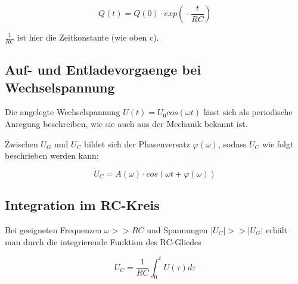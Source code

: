 \begin{equation}
    \label{}
    
Q(t) = Q(0)\cdot exp(-\frac{t}{RC})

\end{equation}

$\frac{1}{RC}$ ist hier die Zeitkonstante (wie oben c).


\subsection{Auf- und Entladevorgaenge bei Wechselspannung}
\label{subsec:Entladevorgaenge bei Wechselspannung}

Die angelegte Wechselspannung $U(t) = U_0 cos(\omega t)$ lässt sich als periodische Anregung beschreiben, 
wie sie auch aus der Mechanik bekannt ist.

Zwischen $U_G$ und $U_C$ bildet sich der Phasenversatz $\varphi(\omega)$, sodass $U_C$ wie folgt beschrieben werden
kann:

\begin{equation}
    U_C = A(\omega) \cdot cos(\omega t + \varphi(\omega))
\end{equation}


\subsection{Integration im RC-Kreis}
\label{subsec:Integration im RC-Kreis}

Bei geeigneten Frequenzen $\omega >> RC$ und Spannungen $|U_C| >> |U_G|$ erhält man durch die integrierende Funktion des RC-Gliedes 

\begin{equation}
    \label{integrator}

    U_C = \frac{1}{RC} \int_{0}^{t} U(\tau) d\tau

\end{equation}


\cite{sample}
